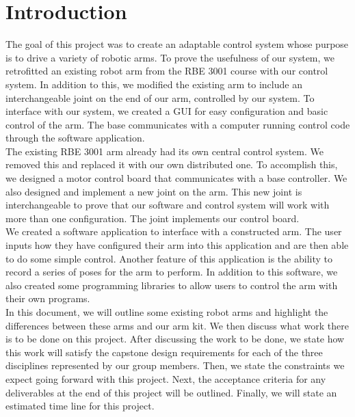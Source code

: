 \section{Introduction} 

The goal of this project was to create an adaptable control system whose purpose is to drive a variety of robotic arms. To prove the usefulness of our system, we retrofitted an existing robot arm from the RBE 3001 course with our control system.  In addition to this, we modified the existing arm to include an interchangeable joint on the end of our arm, controlled by our system. To interface with our system, we created a GUI for easy configuration and basic control of the arm. The base communicates with a computer running control code through the software application. \\
\newline
The existing RBE 3001 arm already had its own central control system. We removed this and replaced it with our own distributed one. To accomplish this, we designed a motor control board that communicates with a base controller.  We also designed and implement a new joint on the arm. This new joint is interchangeable to prove that our software and control system will work with more than one configuration. The joint implements our control board. \\
\newline
We created a software application to interface with a constructed arm. The user inputs how they have configured their arm into this application and are then able to do some simple control. Another feature of this application is the ability to record a series of poses for the arm to perform. In addition to this software, we also created some programming libraries to allow users to control the arm with their own programs. \\
\newline
In this document, we will outline some existing robot arms and highlight the differences between these arms and our arm kit. We then discuss what work there is to be done on this project. After discussing the work to be done, we state how this work will satisfy the capstone design requirements for each of the three disciplines represented by our group members. Then, we state the constraints we expect going forward with this project. Next, the acceptance criteria for any deliverables at the end of this project will be outlined. Finally, we will state an estimated time line for this project.